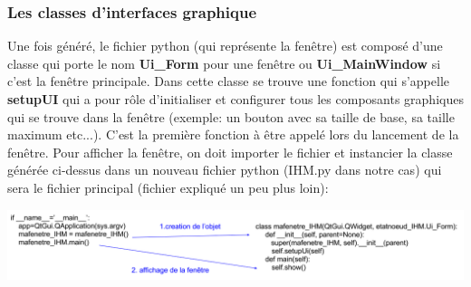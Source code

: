 \documentclass[a4paper,11pt]{article}
\begin{document}
\subsubsection{Les classes d'interfaces graphique}
Une fois généré, le fichier python (qui représente la fenêtre) est composé d'une classe qui porte le nom \textbf{Ui\_Form} pour une fenêtre ou \textbf{Ui\_MainWindow} si c'est la fenêtre principale. Dans cette classe se trouve une fonction qui s'appelle \textbf{setupUI} qui a pour rôle d'initialiser et configurer tous les composants graphiques qui se trouve dans la fenêtre (exemple: un bouton avec sa taille de base, sa taille maximum etc...). C'est la première fonction à être appelé lors du lancement de la fenêtre.
\smallbreak
\noindent
Pour afficher la fenêtre, on doit importer le fichier et instancier la classe générée ci-dessus dans un nouveau fichier python (IHM.py dans notre cas) qui sera le fichier principal (fichier expliqué un peu plus loin):
\begin{center}
\includegraphics[scale=0.45]{initialisation_fenetre.jpg} 
\end{center}
\end{document}
